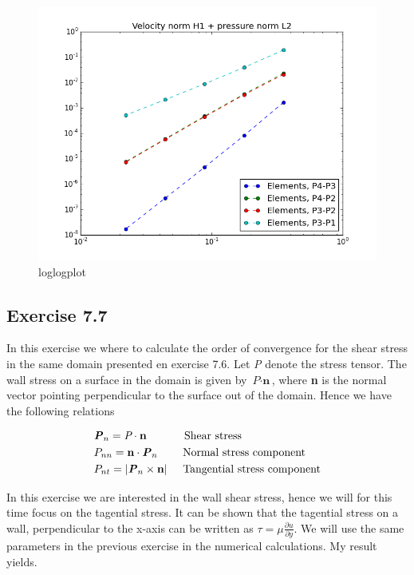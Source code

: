 \documentclass[a4paper,norsk]{article}
\begin{document}
\begin{figure}[h!]
	\centering
	\caption*{loglogplot}
	\includegraphics[scale=0.4]{comb.png}
\end{figure}

\newpage
\subsection{Exercise 7.7}
In this exercise we where to calculate the order of convergence for the shear stress in the same domain presented en exercise 7.6.
Let \textit{P} denote the stress tensor. The wall stress on a surface in the domain is given by $\textit{P} \cdot \textbf{n}$, where \textbf{n} is the normal vector 
pointing perpendicular to the surface out of the domain. Hence we have the following relations

\begin{align*}
 &\textbf{\textit{P}}_n = \textit{P} \cdot \textbf{n} \hspace{12mm} \text{Shear stress} \\
	&P_{nn} = \textbf{n} \cdot \textbf{\textit{P}}_n \hspace{8mm} \text{Normal stress component} \\
	&P_{nt} = |\textbf{\textit{P}}_n \times \textbf{n}| \hspace{5mm} \text{Tangential stress component}
	\end{align*}
	
In this exercise we are interested in the wall shear stress, hence we will for this time focus on the tagential stress.
It can be shown that the tagential stress on a wall, perpendicular to the x-axis can be written as 
$\tau = \mu \frac{\partial u}{\partial y}$. We will use the same parameters in the previous exercise in the numerical
calculations. My result yields.
\end{document}
